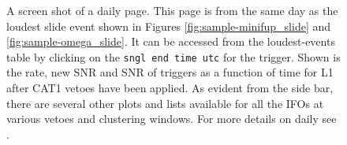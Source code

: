 \begin{figure}[p]
\label{fig:sample-daily_ihope-slide}
\begin{center}
\end{center}
\caption{A screen shot of a daily \ihope page. This page is from the same day as the loudest slide event shown in Figures \ref{fig:sample-minifup_slide} and \ref{fig:sample-omega_slide}. It can be accessed from the loudest-events table by clicking on the \texttt{sngl end time utc} for the trigger. Shown is the rate, new \ac{SNR} and \ac{SNR} of triggers as a function of time for L1 after CAT1 vetoes have been applied. As evident from the side bar, there are several other plots and lists available for all the \acp{IFO} at various vetoes and clustering windows. For more details on daily \ihope see \cite{ref:Larne}.}
\end{figure}

